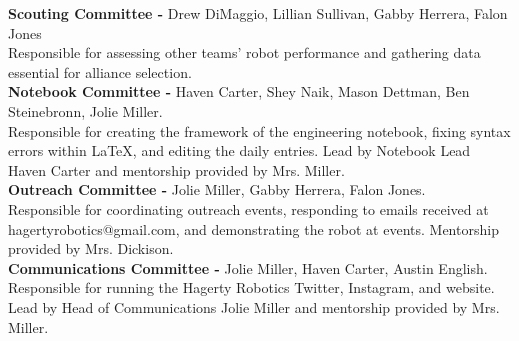 \noindent\textbf{\Large Scouting Committee -} Drew DiMaggio, Lillian Sullivan, Gabby Herrera, Falon Jones \\
Responsible for assessing other teams' robot performance and gathering data essential for alliance selection. \\
\newline\noindent\textbf{\Large Notebook Committee -} Haven Carter, Shey Naik, Mason Dettman, Ben Steinebronn, Jolie Miller.  \\
Responsible for creating the framework of the engineering notebook, fixing syntax errors within \LaTeX, and editing the daily entries. Lead by Notebook Lead Haven Carter and mentorship provided by Mrs. Miller. \\
\newline\noindent\textbf{\Large Outreach Committee -} Jolie Miller, Gabby Herrera, Falon Jones.  \\
Responsible for coordinating outreach events, responding to emails received at hagertyrobotics@gmail.com, and demonstrating the robot at events. Mentorship provided by Mrs. Dickison. \\
\newline\noindent\textbf{\Large Communications Committee -} Jolie Miller, Haven Carter, Austin English.  \\
Responsible for running the Hagerty Robotics Twitter, Instagram, and website. Lead by Head of Communications Jolie Miller and mentorship provided by Mrs. Miller. \\